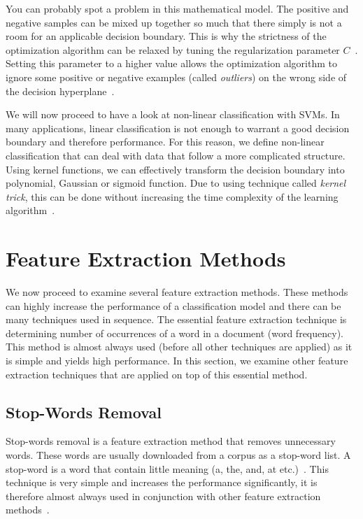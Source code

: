 You can probably spot a problem in this mathematical model. The positive and negative samples can be mixed up together so much that there simply is not a room for an applicable decision boundary. This is why the strictness of the optimization algorithm can be relaxed by tuning the regularization parameter $C$~\cite{manning2008introduction}. Setting this parameter to a higher value allows the optimization algorithm to ignore some positive or negative examples (called \textit{outliers}) on the wrong side of the decision hyperplane~\cite{manning2008introduction}.

We will now proceed to have a look at non-linear classification with SVMs. In many applications, linear classification is not enough to warrant a good decision boundary and therefore performance. For this reason, we define non-linear classification that can deal with data that follow a more complicated structure. Using kernel functions, we can effectively transform the decision boundary into polynomial, Gaussian or sigmoid function. Due to using technique called \textit{kernel trick}, this can be done without increasing the time complexity of the learning algorithm~\cite{manning2008introduction}.

\section{Feature Extraction Methods}

We now proceed to examine several feature extraction methods. These methods can highly increase the performance of a classification model and there can be many techniques used in sequence. The essential feature extraction technique is determining number of occurrences of a word in a document (word frequency). This method is almost always used (before all other techniques are applied) as it is simple and yields high performance. In this section, we examine other feature extraction techniques that are applied on top of this essential method.

\subsection{Stop-Words Removal}

Stop-words removal is a feature extraction method that removes unnecessary words. These words are usually downloaded from a corpus as a stop-word list. A stop-word is a word that contain little meaning (a, the, and, at etc.)~\cite{scott1999feature}. This technique is very simple and increases the performance significantly, it is therefore almost always used in conjunction with other feature extraction methods~\cite{scott1999feature}. 

